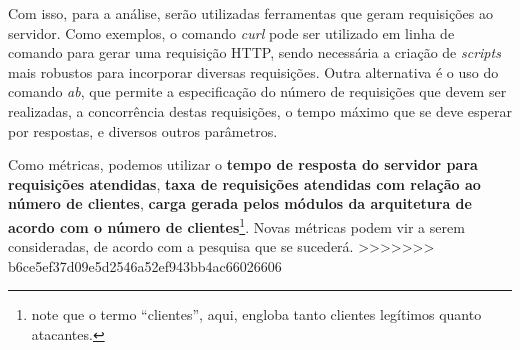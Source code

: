 \documentclass[a4paper, 11pt]{article}
\begin{document}
Com isso, para a análise, serão utilizadas ferramentas que geram requisições ao servidor. Como exemplos, o comando 
\emph{curl} pode ser utilizado em linha de comando para gerar uma requisição HTTP, sendo necessária a criação de \emph{scripts} mais robustos para incorporar diversas requisições. Outra alternativa é o uso do comando \emph{ab}, que permite a especificação do número de requisições que devem ser realizadas, a concorrência destas requisições, o tempo máximo que se deve esperar por respostas, e diversos outros parâmetros.

Como métricas, podemos utilizar o \textbf{tempo de resposta do servidor para requisições atendidas}, \textbf{taxa de requisições atendidas com relação ao número de clientes}, \textbf{carga gerada pelos módulos da arquitetura de acordo com o número de clientes}\footnote{note que o termo ``clientes'', aqui, engloba tanto clientes legítimos quanto atacantes.}. Novas métricas podem vir a serem consideradas, de acordo com a pesquisa que se sucederá.
>>>>>>> b6ce5ef37d09e5d2546a52ef943bb4ac66026606

\end{document}
